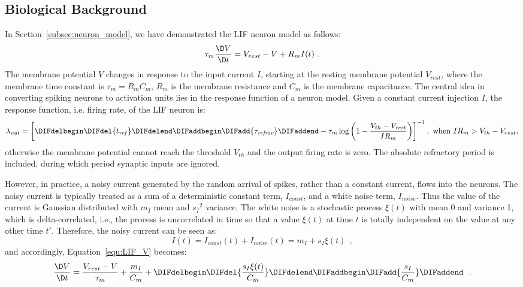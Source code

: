 	
	
	\subsection{Biological Background}
	\label{sec:siergert}
	In Section~\ref{subsec:neuron_model}, we have demonstrated the  LIF neuron model as follows:
	\begin{equation}
	\tau_m \frac{\D V}{\D t}=V_{rest} - V + R_{m} I(t) ~.
	\label{equ:LIF_V}
	\end{equation}
	The membrane potential $V$ changes in response to the input current $I$, starting at the resting membrane potential $V_{rest}$, where the membrane time constant is $\tau_m = R_mC_m$, $R_m$ is the membrane resistance and $C_m$ is the membrane capacitance.
	The central idea in converting spiking neurons to activation units lies in the response function of a neuron model.
	Given a constant current injection $I$, the response function, i.e. firing rate, of the LIF neuron is:
	\begin{equation}
	\lambda_\mathit{out}=
	\left [ \DIFdelbegin \DIFdel{t_\mathit{ref}}\DIFdelend \DIFaddbegin \DIFadd{\tau_{\textit{\textrm{refrac}}}}\DIFaddend -\tau_m\log \left ( 1-\frac{V_{th}-V_\mathit{rest}}{IR_m}  \right )\right ]^{-1}, \textrm{~when~} IR_m>V_{th}-V_{rest},
	\label{equ:consI}
	\end{equation}
	otherwise the membrane potential cannot reach the threshold $V_{th}$ and the output firing rate is zero. 
	The absolute refractory period \DIFdelbegin {}\DIFdelend \DIFaddbegin {}\DIFaddend is included, during which period synaptic inputs are ignored.

	However, in practice, a noisy current generated by the random arrival of spikes, rather than a constant current, flows into the neurons.
	The noisy current is typically treated as a sum of a deterministic constant term, $I_{const}$, and a white noise term, $I_{noise}$.
	Thus the value of the current is Gaussian distributed with $m_I$ mean and ${s_I}^2$ variance.
	The white noise is a stochastic process $\xi(t)$ with mean 0 and variance 1, which is delta-correlated, i.e., the process is uncorrelated in time so that a value $\xi(t)$ at time $t$ is totally independent on the value at any other time $t'$.
	Therefore, the noisy current can be seen as:
	\begin{equation}
	I(t) = I_{const}(t)+I_{noise}(t) = m_I + s_I\xi(t)~~,
	\label{equ:noisyI}
	\end{equation}
	and accordingly, Equation~\ref{equ:LIF_V} becomes:
	\begin{equation}
	\frac{\D V}{\D t}=\frac{V_{rest} - V}{\tau_m } + \frac{m_I}{C_m} + \DIFdelbegin \DIFdel{\frac{s_I\xi(t)}{C_m}}\DIFdelend \DIFaddbegin \DIFadd{\frac{s_I}{C_m}}\DIFaddend ~~.
	\label{equ:LIF_V2}
	\end{equation}


